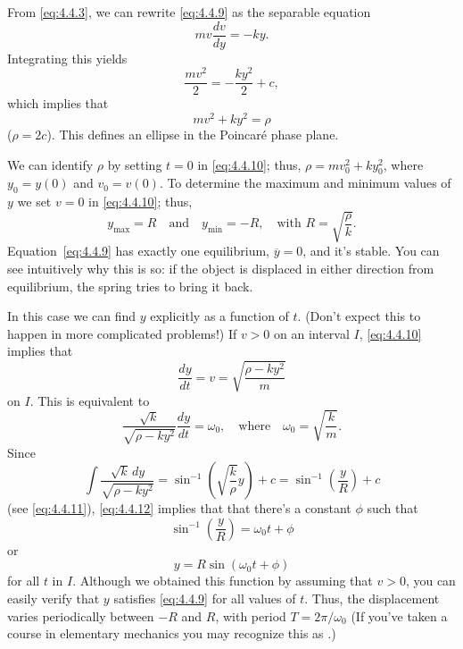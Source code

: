 \documentclass{ximera}
\begin{document}
\begin{example}
From \eqref{eq:4.4.3}, we can rewrite \eqref{eq:4.4.9} as the separable
equation
$$
 mv\frac{dv}{dy}=-ky.
$$
Integrating this  yields
$$
\frac{mv^2}{2}=-\frac{ky^2}{2}+c,
$$
which implies that
\begin{equation} \label{eq:4.4.10}
mv^2+ky^2=\rho
\end{equation}
($\rho=2c$). This defines an ellipse in the Poincar\'e phase plane.

\begin{center}
\end{center}
 
 
 
We can identify $\rho$ by setting $t=0$ in \eqref{eq:4.4.10};   thus,
$\rho=mv_0^2+ky_0^2$, where $y_0=y(0)$ and $v_0=v(0)$. To determine
the maximum and minimum values of $y$ we set $v=0$ in \eqref{eq:4.4.10};
thus,
\begin{equation} \label{eq:4.4.11}
y_{\max}=R\quad\mbox{and}\quad
y_{\min}=-R,\quad\mbox{with } R=\sqrt{\frac{\rho}{k}}.
\end{equation}
Equation~\eqref{eq:4.4.9} has exactly one equilibrium, $\overline{y}=0$,
and
it's stable. You can see intuitively why this is so: if the object is
displaced in either direction from  equilibrium, the spring tries
to bring it back.
 
In this case we can find $y$ explicitly as a function of $t$. (Don't
expect this to happen in more complicated problems!) If $v>0$ on an
interval $I$,  \eqref{eq:4.4.10} implies that
$$
\frac{dy}{dt}=v=\sqrt{\frac{\rho-ky^2}{m}}
$$
on $I$. This is equivalent to
\begin{equation} \label{eq:4.4.12}
\frac{\sqrt{k}}{\sqrt{\rho-ky^2}}\frac{dy}{dt}=\omega_0,\quad\mbox{where}\quad
\omega_0=\sqrt{\frac{k}{m}}.
\end{equation}
Since
$$
\int\frac{\sqrt{k}\,dy}{\sqrt{\rho-ky^2}}=\sin^{-1}\left(\sqrt{\frac{k}{\rho}}y\right)+c=\sin^{-1}\left(\frac{y}{R}\right)+c
$$
(see \eqref{eq:4.4.11}), \eqref{eq:4.4.12} implies that that there's a
constant $\phi$ such that
$$
\sin^{-1}\left(\frac{y}{R}\right)=\omega_0 t+\phi
$$
or
$$
y=R\sin(\omega_0 t+\phi)
$$
for all $t$ in $I$. Although we obtained this function by assuming that
$v>0$, you can easily verify that $y$ satisfies \eqref{eq:4.4.9} for all
values of $t$. Thus, the displacement varies periodically between $-R$
and $R$, with period $T=2\pi/\omega_0$ (If
you've taken a course in elementary mechanics you may recognize this
as .)


\end{example}
\end{document}
